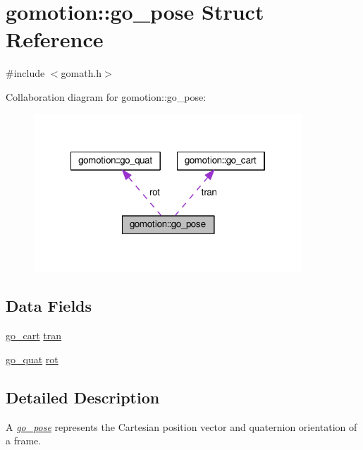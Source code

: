 \hypertarget{structgomotion_1_1go__pose}{\section{gomotion\-:\-:go\-\_\-pose Struct Reference}
\label{structgomotion_1_1go__pose}
}


{\ttfamily \#include $<$gomath.\-h$>$}



Collaboration diagram for gomotion\-:\-:go\-\_\-pose\-:\nopagebreak
\begin{figure}[H]
\begin{center}
\leavevmode
\includegraphics[width=285pt]{de/d41/structgomotion_1_1go__pose__coll__graph}
\end{center}
\end{figure}
\subsection*{Data Fields}
\begin{DoxyCompactItemize}
\item 
\hyperlink{structgomotion_1_1go__cart}{go\-\_\-cart} \hyperlink{structgomotion_1_1go__pose_afbe37cf24135dfc3cadf3536e88d7e8e}{tran}
\item 
\hyperlink{structgomotion_1_1go__quat}{go\-\_\-quat} \hyperlink{structgomotion_1_1go__pose_af30134c2f4d702ec890ec6726051cf8e}{rot}
\end{DoxyCompactItemize}


\subsection{Detailed Description}
A {\itshape \hyperlink{structgomotion_1_1go__pose}{go\-\_\-pose}} represents the Cartesian position vector and quaternion orientation of a frame. 

